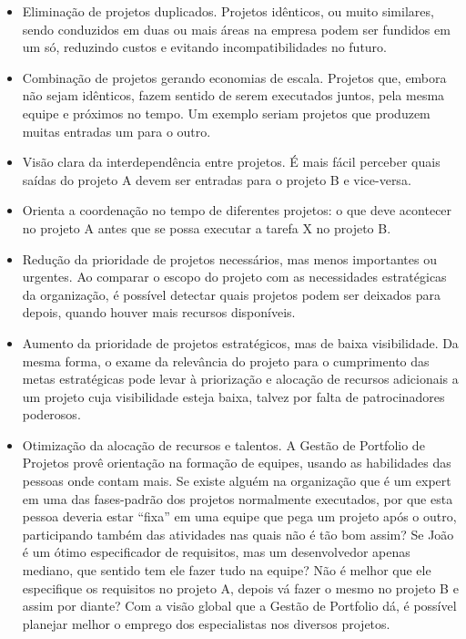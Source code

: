 \documentclass[a4paper,10pt]{article}
\begin{document}
\begin{itemize}
 \item Eliminação de projetos duplicados. Projetos idênticos, ou muito similares, sendo conduzidos em duas ou mais áreas na empresa podem ser fundidos em um só, reduzindo custos e evitando incompatibilidades no futuro.
 \item Combinação de projetos gerando economias de escala. Projetos que, embora não sejam idênticos, fazem sentido de serem executados juntos, pela mesma equipe e próximos no tempo. Um exemplo seriam projetos que produzem muitas entradas um para o outro.
 \item Visão clara da interdependência entre projetos. É mais fácil perceber quais saídas do projeto A devem ser entradas para o projeto B e vice-versa.
 \item Orienta a coordenação no tempo de diferentes projetos: o que deve acontecer no projeto A antes que se possa executar a tarefa X no projeto B.
 \item Redução da prioridade de projetos necessários, mas menos importantes ou urgentes. Ao comparar o escopo do projeto com as necessidades estratégicas da organização, é possível detectar quais projetos podem ser deixados para depois, quando houver mais recursos disponíveis.
 \item Aumento da prioridade de projetos estratégicos, mas de baixa visibilidade. Da mesma forma, o exame da relevância do projeto para o cumprimento das metas estratégicas pode levar à priorização e alocação de recursos adicionais a um projeto cuja visibilidade esteja baixa, 
talvez por falta de patrocinadores poderosos.
 \item Otimização da alocação de recursos e talentos. A Gestão de Portfolio de Projetos provê orientação na formação de equipes, usando as habilidades das pessoas onde contam mais. Se existe alguém na organização que é um expert em uma das fases-padrão dos projetos normalmente 
executados, por que esta pessoa deveria estar “fixa” em uma equipe que pega um projeto após o outro, participando também das atividades nas quais não é tão bom assim? Se João é um ótimo especificador de requisitos, mas um desenvolvedor apenas mediano, que sentido tem ele fazer 
tudo na equipe? Não é melhor que ele especifique os requisitos no projeto A, depois vá fazer o mesmo no projeto B e assim por diante? Com a visão global que a Gestão de Portfolio dá, é possível planejar melhor o emprego dos especialistas nos diversos projetos.
\end{itemize}
\end{document}
